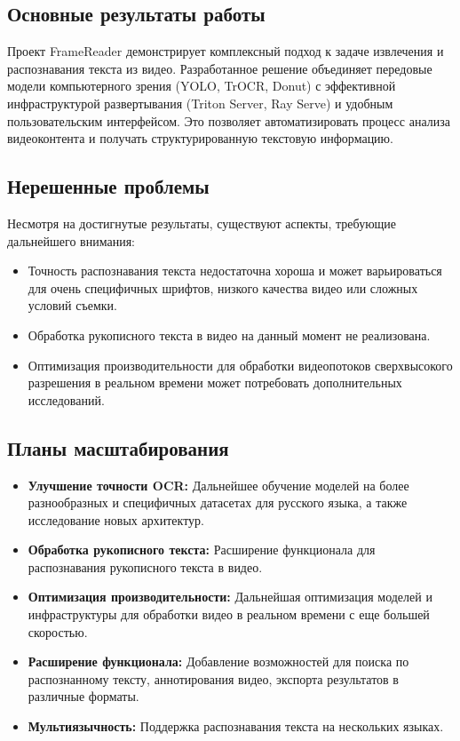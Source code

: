 \documentclass[12pt, a4paper]{article}
\theoremstyle{definition}
\theoremstyle{remark}
\begin{document}
	\subsection{Основные результаты работы}
	Проект FrameReader демонстрирует комплексный подход к задаче извлечения и распознавания текста из видео. Разработанное решение объединяет передовые модели компьютерного зрения (YOLO, TrOCR, Donut) с эффективной инфраструктурой развертывания (Triton Server, Ray Serve) и удобным пользовательским интерфейсом. Это позволяет автоматизировать процесс анализа видеоконтента и получать структурированную текстовую информацию.
	
	\subsection{Нерешенные проблемы}
	Несмотря на достигнутые результаты, существуют аспекты, требующие дальнейшего внимания:
	\begin{itemize}
		\item Точность распознавания текста недостаточна хороша и может варьироваться для очень специфичных шрифтов, низкого качества видео или сложных условий съемки.
		\item Обработка рукописного текста в видео на данный момент не реализована.
		\item Оптимизация производительности для обработки видеопотоков сверхвысокого разрешения в реальном времени может потребовать дополнительных исследований.
	\end{itemize}
	
	\subsection{Планы масштабирования}
	\begin{itemize}
		\item \textbf{Улучшение точности OCR:} Дальнейшее обучение моделей на более разнообразных и специфичных датасетах для русского языка, а также исследование новых архитектур.
		\item \textbf{Обработка рукописного текста:} Расширение функционала для распознавания рукописного текста в видео.
		\item \textbf{Оптимизация производительности:} Дальнейшая оптимизация моделей и инфраструктуры для обработки видео в реальном времени с еще большей скоростью.
		\item \textbf{Расширение функционала:} Добавление возможностей для поиска по распознанному тексту, аннотирования видео, экспорта результатов в различные форматы.
		\item \textbf{Мультиязычность:} Поддержка распознавания текста на нескольких языках.
	\end{itemize}
	
\end{document}
